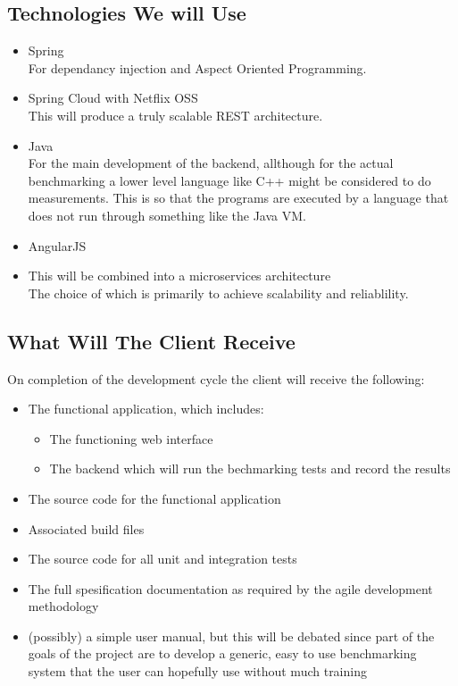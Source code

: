 \subsection{Technologies We will Use}
\begin{itemize}
	\item Spring\\
	For dependancy injection and Aspect Oriented Programming.
	\item Spring Cloud with Netflix OSS\\
	This will produce a truly scalable REST architecture.
	\item Java\\
	For the main development of the backend, allthough for the actual benchmarking a lower level language like C++ might be considered
	to do measurements. This is so that the programs are executed by a language that does not run through something like the Java VM.
	\item AngularJS
	\item This will be combined into a microservices architecture\\
	The choice of which is primarily to achieve scalability and reliablility.
\end{itemize} 

\subsection{What Will The Client Receive}
On completion of the development cycle the client will receive the following:
\begin{itemize}
	\item The functional application, which includes:
	\begin{itemize}
		\item The functioning web interface
		\item The backend which will run the bechmarking tests and record the results
	\end{itemize}
	\item The source code for the functional application
	\item Associated build files
	\item The source code for all unit and integration tests
	\item The full spesification documentation as required by the agile development methodology
	\item (possibly) a simple user manual, but this will be debated since part of the goals of the project are to develop a generic, easy to use benchmarking system that the user can hopefully use without much training
\end{itemize}
